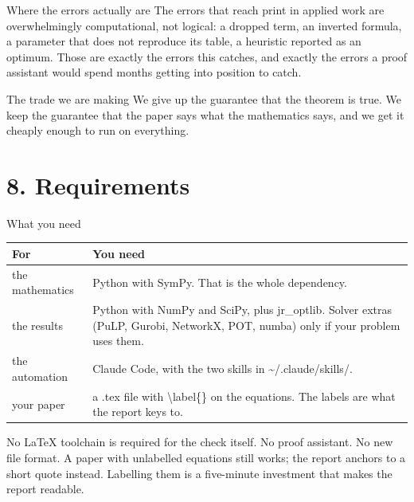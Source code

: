 \documentclass[aspectratio=169,11pt]{beamer}
\newcommand{\code}[1]{{\ttfamily\small #1}}
\begin{document}
\begin{frame}{Where the errors actually are}
  The errors that reach print in applied work are overwhelmingly \alert{computational, not
  logical}: a dropped term, an inverted formula, a parameter that does not reproduce its table, a
  heuristic reported as an optimum.
  \vfill
  Those are exactly the errors this catches, and exactly the errors a proof assistant would spend
  months getting into position to catch.
  \vfill
  \begin{block}{The trade we are making}
    We give up the guarantee that the theorem is true. We keep the guarantee that the paper says
    what the mathematics says, and we get it cheaply enough to run on everything.
  \end{block}
\end{frame}

\section{8. Requirements}
\begin{frame}[plain]
  \vfill{}\vfill
\end{frame}

\begin{frame}{What you need}
  \begin{center}
  \begin{tabular}{@{}lp{}@{}}
    \toprule
    \textbf{For} & \textbf{You need} \\
    \midrule
    the mathematics & Python with SymPy. That is the whole dependency. \\[0.5em]
    the results     & Python with NumPy and SciPy, plus \code{jr\_optlib}. Solver extras
                      (PuLP, Gurobi, NetworkX, POT, numba) only if your problem uses them. \\[0.5em]
    the automation  & Claude Code, with the two skills in \code{\~{}/.claude/skills/}. \\[0.5em]
    your paper      & a \code{.tex} file with \code{{\textbackslash}label\{\}} on the equations.
                      The labels are what the report keys to. \\
    \bottomrule
  \end{tabular}
  \end{center}
  \vfill
  No LaTeX toolchain is required for the check itself. No proof assistant. No new file format.
  \vfill
  {\color{slate} A paper with unlabelled equations still works; the report anchors to a short quote
  instead. Labelling them is a five-minute investment that makes the report readable.}
\end{frame}
\end{document}
